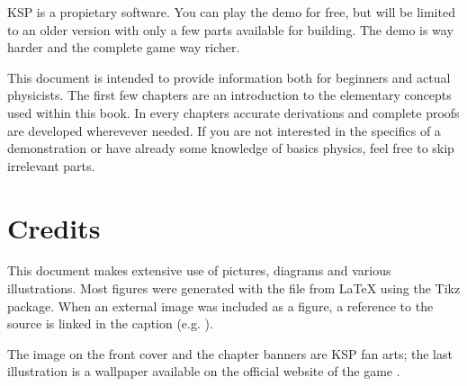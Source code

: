 \begin{remark}
KSP is a propietary software. You can play the demo for free, but will
be limited to an older version with only a few parts available for
building. The demo is way harder and the complete game way richer.
\end{remark}

\begin{important}
This document is intended to provide information both for beginners and
actual physicists. The first few chapters are an introduction to the
elementary concepts used within this book. In every chapters accurate
derivations and complete proofs are developed wherevever needed. If you
are not interested in the specifics of a demonstration or have already
some knowledge of basics physics, feel free to skip irrelevant parts.
\end{important}



\section*{Credits}

This document makes extensive use of pictures, diagrams and various
illustrations. Most figures were generated with the file from \LaTeX
using the Tikz package. When an external image was included as a figure,
a reference to the source is linked in the caption (e.g. \cite{xkcd1356}).

The image on the front cover \cite{3kerbalmun} and the chapter banners
\cite{banners} are KSP fan arts; the last illustration is a wallpaper
available on the official website of the game \cite{ksp}.
